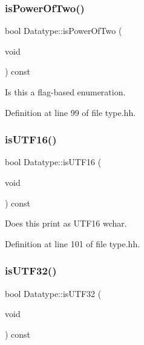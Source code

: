 \subsubsection{\texorpdfstring{isPowerOfTwo()}{isPowerOfTwo()}}
{\footnotesize\ttfamily bool Datatype\+::is\+Power\+Of\+Two (\begin{DoxyParamCaption}\item[{void}]{ }\end{DoxyParamCaption}) const\hspace{0.3cm}{\ttfamily [inline]}}



Is this a flag-\/based enumeration. 



Definition at line 99 of file type.\+hh.

\mbox{\label{class_datatype_a16d6ad1187428213dcdce8353bf91505}} 
\subsubsection{\texorpdfstring{isUTF16()}{isUTF16()}}
{\footnotesize\ttfamily bool Datatype\+::is\+U\+T\+F16 (\begin{DoxyParamCaption}\item[{void}]{ }\end{DoxyParamCaption}) const\hspace{0.3cm}{\ttfamily [inline]}}



Does this print as U\+T\+F16 \textquotesingle{}wchar\textquotesingle{}. 



Definition at line 101 of file type.\+hh.

\mbox{\label{class_datatype_a6d14288e0d2a8998920b29f1e614bf3c}} 
\subsubsection{\texorpdfstring{isUTF32()}{isUTF32()}}
{\footnotesize\ttfamily bool Datatype\+::is\+U\+T\+F32 (\begin{DoxyParamCaption}\item[{void}]{ }\end{DoxyParamCaption}) const\hspace{0.3cm}{\ttfamily [inline]}}



